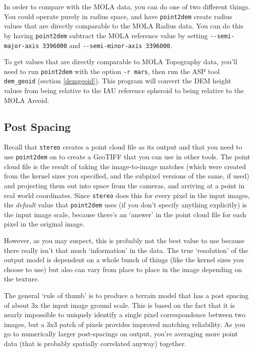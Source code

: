 In order to compare with the MOLA data, you can do one of two
different things.  You could operate purely in radius space, and
have \texttt{point2dem} create radius values that are directly
comparable to the MOLA Radius data.  You can do this by having
\texttt{point2dem} subtract the MOLA reference value by setting
\texttt{-\/-semi-major-axis 3396000} and \texttt{-\/-semi-minor-axis
3396000}.

To get values that are directly comparable to MOLA Topography data,
you'll need to run \texttt{point2dem} with the option \texttt{-r mars},
then run the ASP tool \texttt{dem\_geoid} (section \ref{demgeoid}). This
program will convert the DEM height values from being relative to the IAU
reference spheroid to being relative to the MOLA Areoid.

\subsection{Post Spacing}
\label{post-spacing}

Recall that \texttt{stereo} creates a point cloud file as its output
and that you need to use \texttt{point2dem} on to create a GeoTIFF that
you can use in other tools.  The point cloud file is the result of
taking the image-to-image matches (which were created from the
kernel sizes you specified, and the subpixel versions of the same,
if used) and projecting them out into space from the cameras, and
arriving at a point in real world coordinates.  Since \texttt{stereo} does
this for every pixel in the input images, the \emph{default} value that
\texttt{point2dem} uses (if you don't specify anything explicitly) is the
input image scale, because there's an `answer' in the point cloud
file for each pixel in the original image.

However, as you may suspect, this is probably not the best value to
use because there really isn't that much `information' in the data.
The true `resolution' of the output model is dependent on a whole
bunch of things (like the kernel sizes you choose to use) but also can
vary from place to place in the image depending on the texture.

The general `rule of thumb' is to produce a terrain model that has a
post spacing of about 3x the input image ground scale.  This is based
on the fact that it is nearly impossible to uniquely identify a single
pixel correspondence between two images, but a 3x3 patch of pixels
provides improved matching reliability.  As you go to numerically
larger post-spacings on output, you're averaging more point data (that
is probably spatially correlated anyway) together.

